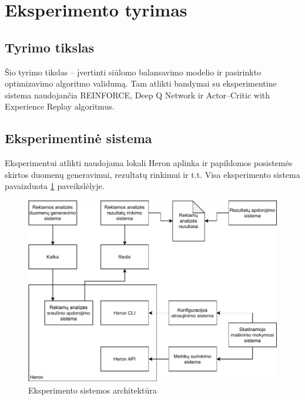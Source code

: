 \documentclass{VUMIFPSbakalaurinis}
\begin{document}
\section{Eksperimento tyrimas}

\subsection{Tyrimo tikslas}

Šio tyrimo tikslas – įvertinti siūlomo balansavimo modelio ir pasirinkto optimizavimo algoritmo validumą. Tam atlikti bandymai su eksperimentine sistema naudojančia REINFORCE, Deep Q Network ir Actor–Critic with Experience Replay algoritmus.

\subsection{Eksperimentinė sistema}

Eksperimentui atlikti naudojama lokali Heron aplinka ir papildomos posistemės skirtos duomenų generavimui, rezultatų rinkimui ir t.t. Visa eksperimento sistema pavaizduota \ref{experiment} paveikslėlyje.

\begin{figure}[H]
    \includegraphics[width=14cm]{img/Experiment.pdf}
    \caption{Eksperimento sistemos architektūra}
    \label{experiment}
\end{figure} 
\end{document}
